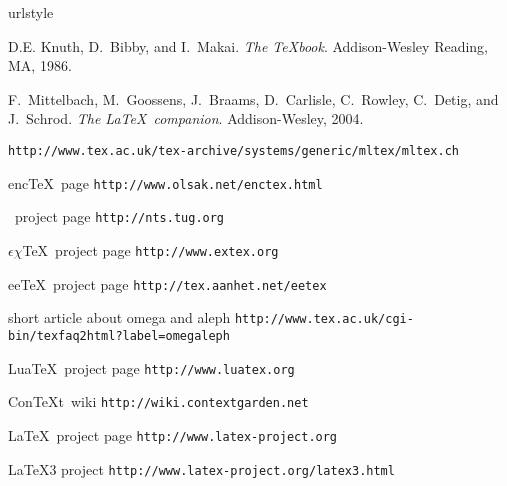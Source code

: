 \documentclass{scrartcl}
\def\ConTeXt{Con\TeX{}t}
\begin{document}
\newpage
\normalsize
\begin{thebibliography}{10}
\providecommand{\natexlab}[1]{#1}
\providecommand{\url}[1]{\texttt{#1}}
\expandafter\ifx\csname urlstyle\endcsname\relax
  \providecommand{\doi}[1]{doi: #1}\else
  \providecommand{\doi}{doi: \begingroup \urlstyle{rm}\Url}\fi


D.E. Knuth, D.~Bibby, and I.~Makai.
\newblock \emph{{The \TeX book}}.
\newblock Addison-Wesley Reading, MA, 1986.

F.~Mittelbach, M.~Goossens, J.~Braams, D.~Carlisle, C.~Rowley, C.~Detig, and
  J.~Schrod.
\newblock \emph{{The \LaTeX\ companion}}.
\newblock Addison-Wesley, 2004.


\newblock \url{http://www.tex.ac.uk/tex-archive/systems/generic/mltex/mltex.ch}

{enc\TeX\ page}
\newblock \url{http://www.olsak.net/enctex.html}

{\NTS\ project page}
\newblock \url{http://nts.tug.org}

{$\epsilon\chi$\TeX\ project page}
\newblock \url{http://www.extex.org}

{ee\TeX\ project page}
\newblock \url{http://tex.aanhet.net/eetex}

{short article about omega and aleph}
\newblock \url{http://www.tex.ac.uk/cgi-bin/texfaq2html?label=omegaleph}

{Lua\TeX\ project page}
\newblock \url{http://www.luatex.org}



\ConTeXt\ wiki
\newblock \url{http://wiki.contextgarden.net}

{\LaTeX\ project page}
\newblock \url{http://www.latex-project.org}

{\LaTeX3 project}
\newblock \url{http://www.latex-project.org/latex3.html}

\end{thebibliography}
\end{document}

